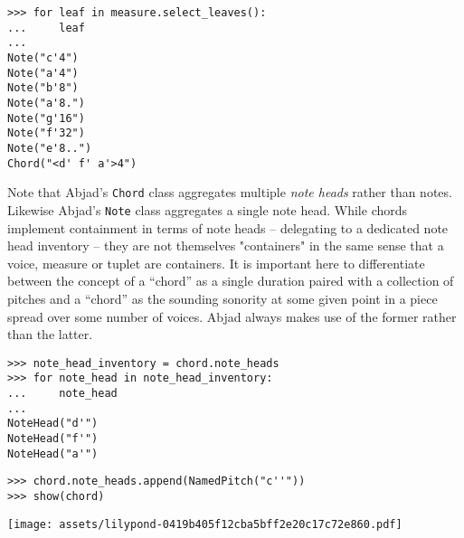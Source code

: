 \begin{abjadbookoutput}
\begin{singlespacing}
\vspace{-0.5\baselineskip}
\begin{lstlisting}
>>> for leaf in measure.select_leaves():
...     leaf
...
Note("c'4")
Note("a'4")
Note("b'8")
Note("a'8.")
Note("g'16")
Note("f'32")
Note("e'8..")
Chord("<d' f' a'>4")
\end{lstlisting}
\end{singlespacing}
\end{abjadbookoutput}

\noindent Note that Abjad's \texttt{Chord} class aggregates multiple \emph{note
heads} rather than notes. Likewise Abjad's \texttt{Note} class aggregates a
single note head. While chords implement containment in terms of note heads --
delegating to a dedicated note head inventory -- they are not themselves
"containers" in the same sense that a voice, measure or tuplet are containers.
It is important here to differentiate between the concept of a \enquote{chord}
as a single duration paired with a collection of pitches and a \enquote{chord}
as the sounding sonority at some given point in a piece spread over some number
of voices. Abjad always makes use of the former rather than the latter.

\begin{comment}
<abjad>
note_head_inventory = chord.note_heads
for note_head in note_head_inventory:
    note_head

chord.note_heads.append(NamedPitch("c''"))
show(chord)
</abjad>
\end{comment}

\begin{abjadbookoutput}
\begin{singlespacing}
\vspace{-0.5\baselineskip}
\begin{lstlisting}
>>> note_head_inventory = chord.note_heads
>>> for note_head in note_head_inventory:
...     note_head
...
NoteHead("d'")
NoteHead("f'")
NoteHead("a'")
\end{lstlisting}
\begin{lstlisting}
>>> chord.note_heads.append(NamedPitch("c''"))
>>> show(chord)
\end{lstlisting}
\noindent\texttt{[image: assets/lilypond-0419b405f12cba5bff2e20c17c72e860.pdf]}
\end{singlespacing}
\end{abjadbookoutput}

